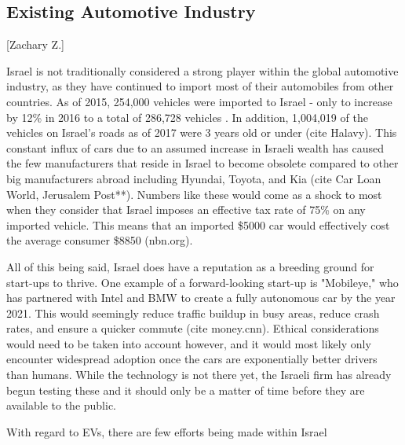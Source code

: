 \documentclass{article}                         %
\begin{document}
\subsection{Existing Automotive Industry}[Zachary Z.]

Israel is not traditionally considered a strong player within the global automotive industry, as they have continued to import most of their automobiles from other countries. As of 2015, 254,000 vehicles were imported to Israel - only to increase by 12\% in 2016 to a total of 286,728 vehicles \cite{}. In addition, 1,004,019 of the vehicles on Israel's roads as of 2017 were 3 years old or under (cite Halavy). This constant influx of cars due to an assumed increase in Israeli wealth has caused the few manufacturers that reside in Israel to become obsolete compared to other big manufacturers abroad including Hyundai, Toyota, and Kia (cite Car Loan World, Jerusalem Post**). Numbers like these would come as a shock to most when they consider that Israel imposes an effective tax rate of 75\% on any imported vehicle. This means that an imported \$5000 car would effectively cost the average consumer \$8850 (nbn.org). 

All of this being said, Israel does have a reputation as a breeding ground for start-ups to thrive. One example of a forward-looking start-up is "Mobileye," who has partnered with Intel and BMW to create a fully autonomous car by the year 2021. This would seemingly reduce traffic buildup in busy areas, reduce crash rates, and ensure a quicker commute (cite money.cnn). Ethical considerations would need to be taken into account however, and it would most likely only encounter widespread adoption once the cars are exponentially better drivers than humans. While the technology is not there yet, the Israeli firm has already begun testing these and it should only be a matter of time before they are available to the public.  

With regard to EVs, there are few efforts being made within Israel 

\end{document}
